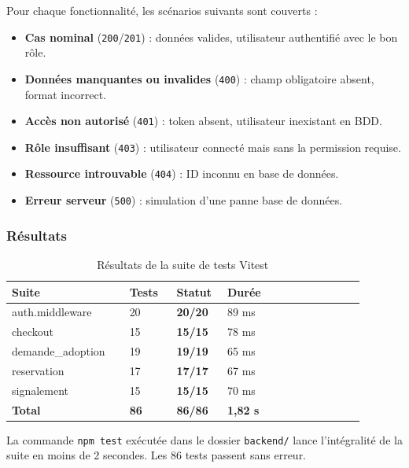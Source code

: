 \documentclass[12pt,a4paper]{report}
\begin{document}
Pour chaque fonctionnalité, les scénarios suivants sont couverts :
\begin{itemize}[leftmargin=2em,itemsep=2pt]
  \item \textbf{Cas nominal} (\texttt{200}/\texttt{201}) : données valides, utilisateur authentifié avec le bon rôle.
  \item \textbf{Données manquantes ou invalides} (\texttt{400}) : champ obligatoire absent, format incorrect.
  \item \textbf{Accès non autorisé} (\texttt{401}) : token absent, utilisateur inexistant en BDD.
  \item \textbf{Rôle insuffisant} (\texttt{403}) : utilisateur connecté mais sans la permission requise.
  \item \textbf{Ressource introuvable} (\texttt{404}) : ID inconnu en base de données.
  \item \textbf{Erreur serveur} (\texttt{500}) : simulation d'une panne base de données.
\end{itemize}

\subsubsection{Résultats}

\begin{table}[H]
\centering
\begin{tabular}{@{}L{0.30\linewidth}C{0.12\linewidth}C{0.12\linewidth}L{0.35\linewidth}@{}}
\toprule
\textbf{Suite} & \textbf{Tests} & \textbf{Statut} & \textbf{Durée} \\
\midrule
auth.middleware & 20 & \textcolor{okgreen}{\textbf{20/20}} & 89 ms \\
checkout & 15 & \textcolor{okgreen}{\textbf{15/15}} & 78 ms \\
demande\_adoption & 19 & \textcolor{okgreen}{\textbf{19/19}} & 65 ms \\
reservation & 17 & \textcolor{okgreen}{\textbf{17/17}} & 67 ms \\
signalement & 15 & \textcolor{okgreen}{\textbf{15/15}} & 70 ms \\
\midrule
\textbf{Total} & \textbf{86} & \textcolor{okgreen}{\textbf{86/86}} & \textbf{1,82 s} \\
\bottomrule
\end{tabular}
\caption{Résultats de la suite de tests Vitest}
\label{tab:vitest-results}
\end{table}

La commande \texttt{npm test} exécutée dans le dossier \texttt{backend/} lance l'intégralité de la suite en moins de 2 secondes. Les 86 tests passent sans erreur.
\end{document}
